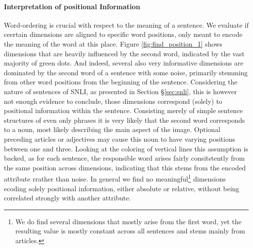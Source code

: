 \paragraph*{Interpretation of positional Information}
Word-ordering is crucial  with respect to the meaning of a sentence. We evaluate if ceertain dimensions are aligned to specific word positions, only meant to encode the meaning of the word at this place. Figure \ref{fig:find_position_1} shows dimensions that are heavily influenced by the second word, indicated by the vast majority of green dots. And indeed, several also very informative dimensions are dominated by the second word of a sentence with some noise, primarily stemming from other word positions from the beginning of the sentence. Considering the nature of sentences of \ac{SNLI}, as presented in Section §\ref{sec:snli}, this is however not enough evidence to conclude, those dimensions correspond (solely) to positional information within the sentence. Consisting merely of simple sentence structures of even only phrases it is very likely that the second word corresponds to a noun, most likely describing the main aspect of the image. Optional preceding articles or adjectives may cause this noun to have varying positions between one and three. Looking at the coloring of vertical lines this assumption is backed, as for each sentence, the responsible word arises fairly consitstently from the same position across dimensions, indicating that this stems from the encoded attribute rrather than noise. In general we find no meaningful\footnote{We do find several dimensions that mostly arise from the first word, yet the resulting value is mostly constant across all sentences and stems mainly from articles.} dimensions ecoding solely positional information, either absolute or relative, without being correlated strongly with another attribute.
